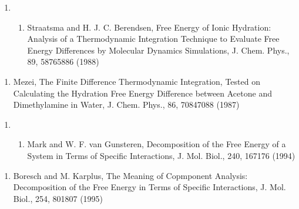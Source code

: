\documentclass[letterpaper,11pt,english]{sphinxmanual}
\begin{document}
\begin{enumerate}
%
\setcounter{enumi}{19}
\item {} \begin{enumerate}
%
\setcounter{enumii}{15}
\item {} 
Straatsma and H. J. C. Berendsen, Free Energy of Ionic Hydration:  Analysis of a Thermodynamic Integration Technique to Evaluate Free Energy Differences by Molecular Dynamics Simulations, J. Chem. Phys., 89, 5876\sphinxhyphen{}5886 (1988)

\end{enumerate}

\end{enumerate}
\begin{enumerate}
%
\setcounter{enumi}{12}
\item {} 
Mezei, The Finite Difference Thermodynamic Integration, Tested on Calculating the Hydration Free Energy Difference between Acetone and Dimethylamine in Water, J. Chem. Phys., 86, 7084\sphinxhyphen{}7088 (1987)

\end{enumerate}
\begin{enumerate}
%
\item {} \begin{enumerate}
%
\setcounter{enumii}{4}
\item {} 
Mark and W. F. van Gunsteren, Decomposition of the Free Energy of a System in Terms of Specific Interactions, J. Mol. Biol., 240, 167\sphinxhyphen{}176 (1994)

\end{enumerate}

\end{enumerate}
\begin{enumerate}
%
\setcounter{enumi}{18}
\item {} 
Boresch and M. Karplus, The Meaning of Copmponent Analysis: Decomposition of the Free Energy in Terms of Specific Interactions, J. Mol. Biol., 254, 801\sphinxhyphen{}807 (1995)

\end{enumerate}
\end{document}
